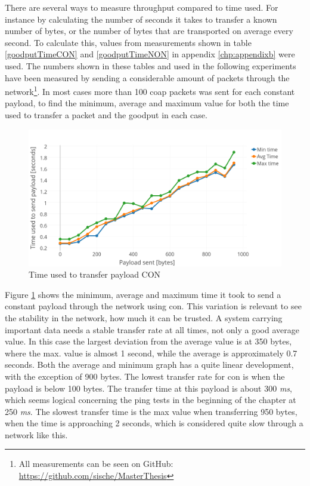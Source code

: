 \noindent There are several ways to measure throughput compared to time used. For instance by calculating the number of seconds it takes to transfer a known number of bytes, or the number of bytes that are transported on average every second. To calculate this, values from measurements shown in table \ref{goodputTimeCON} and \ref{goodputTimeNON} in appendix \ref{chp:appendixb} were used. The numbers shown in these tables and used in the following experiments have been measured by sending a considerable amount of packets through the network\footnote{All measurements can be seen on GitHub: \url{https://github.com/sische/MasterThesis}}. In most cases more than 100 \gls{coap} packets was sent for each constant payload, to find the minimum, average and maximum value for both the time used to transfer a packet and the \gls{goodput} in each case. 

\begin{figure}[h!]
    \centering
    \includegraphics[width=1.0\textwidth]{bytesPrSecondNew3.png}    
    \caption{Time used to transfer payload CON}
    \label{fig:bytesPRSecond3}
\end{figure}


\noindent Figure \ref{fig:bytesPRSecond3} shows the minimum, average and maximum time it took to send a constant payload through the network using \gls{con}. This variation is relevant to see the stability in the network, how much it can be trusted. A system carrying important data needs a stable transfer rate at all times, not only a good average value. In this case the largest deviation from the average value is at 350 bytes, where the max. value is almost 1 second, while the average is approximately 0.7 seconds. Both the average and minimum graph has a quite linear development, with the exception of 900 bytes. The lowest transfer rate for \gls{con} is when the payload is below 100 bytes. The transfer time at this payload is about 300 \textit{ms}, which seems logical concerning the ping tests in the beginning of the chapter at 250 \textit{ms}. The slowest transfer time is the max value when transferring 950 bytes, when the time is approaching 2 seconds, which is considered quite slow through a network like this. %

